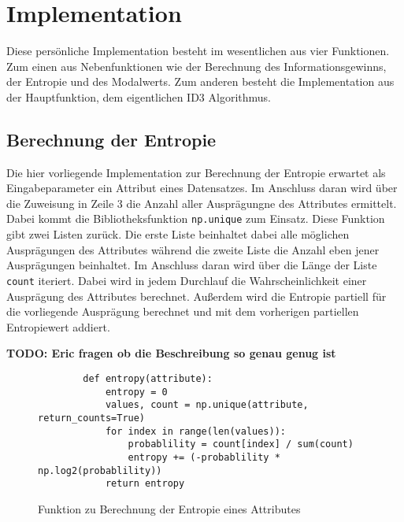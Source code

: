 \section{Implementation}
\label{id3:implementation}

Diese persönliche Implementation besteht im wesentlichen aus vier Funktionen. Zum einen aus Nebenfunktionen wie der Berechnung des Informationsgewinns, der Entropie und des Modalwerts. Zum anderen besteht die Implementation aus der Hauptfunktion, dem eigentlichen ID3 Algorithmus.


\subsection{Berechnung der Entropie}
\label{id3:implementation-entropie}
Die hier vorliegende Implementation zur Berechnung der Entropie erwartet als Eingabeparameter ein Attribut eines Datensatzes. Im Anschluss daran wird über die Zuweisung in Zeile 3 die Anzahl aller Ausprägungne des Attributes ermittelt. Dabei kommt die Bibliotheksfunktion \texttt{np.unique} zum Einsatz. Diese Funktion gibt zwei Listen zurück. Die erste Liste beinhaltet dabei alle möglichen Ausprägungen des Attributes während die zweite Liste die Anzahl eben jener Ausprägungen beinhaltet. Im Anschluss daran wird über die Länge der Liste \texttt{count} iteriert. Dabei wird in jedem Durchlauf die Wahrscheinlichkeit einer Ausprägung des Attributes berechnet. Außerdem wird die Entropie partiell für die vorliegende Ausprägung berechnet und mit dem vorherigen partiellen Entropiewert addiert.

\textbf{TODO: Eric fragen ob die Beschreibung so genau genug ist}

\begin{figure}[htbp]
    \vspace{0.5cm}
    \begin{verbatim}
        def entropy(attribute):
            entropy = 0
            values, count = np.unique(attribute, return_counts=True)
            for index in range(len(values)):
                probablility = count[index] / sum(count)
                entropy += (-probablility * np.log2(probablility))
            return entropy
    \end{verbatim}
    \caption{Funktion zu Berechnung der Entropie eines Attributes\autocites{PythonCourseDecisionTrees:online}{ImplementationID3}}
\end{figure}

